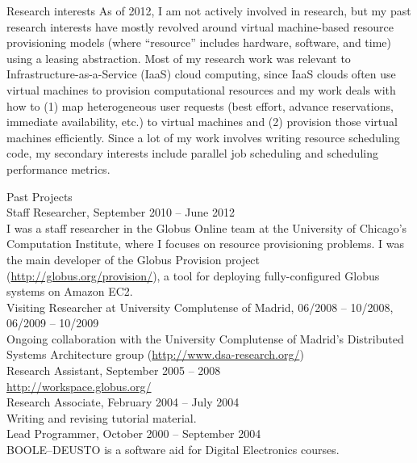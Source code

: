 \documentclass{resume}
\begin{document}
\begin{category}{Research interests}
\citembullet As of 2012, I am not actively involved in research, but my past research interests have mostly revolved around virtual machine-based resource provisioning models (where ``resource'' includes hardware, software, and time) using a leasing abstraction. Most of my research work was relevant to Infrastructure-as-a-Service (IaaS) cloud computing, since IaaS clouds often use virtual machines to provision computational resources and my work deals with how to (1) map heterogeneous user requests (best effort, advance reservations, immediate availability, etc.) to virtual machines and (2) provision those virtual machines efficiently. Since a lot of my work involves writing resource scheduling code, my secondary interests include parallel job scheduling and scheduling performance metrics.
\end{category}
\begin{category}{Past Projects}
\\
Staff Researcher, September 2010 -- June 2012\\
I was a staff researcher in the Globus Online team at the University of Chicago's Computation Institute, where I focuses on resource provisioning problems. I was the main developer of the Globus Provision project (\url{http://globus.org/provision/}), a tool for deploying fully-configured Globus systems on Amazon EC2.
\\
Visiting Researcher at University Complutense of Madrid, 06/2008 -- 10/2008, 06/2009 -- 10/2009\\
Ongoing collaboration with the University Complutense of Madrid's Distributed Systems Architecture group (\url{http://www.dsa-research.org/})
\\
Research Assistant, September 2005 -- 2008\\
\url{http://workspace.globus.org/}
\\
Research Associate, February 2004 -- July 2004\\
Writing and revising tutorial material.
\\ 
Lead Programmer, October 2000 -- September 2004\\
\textsf{BOOLE--DEUSTO} is a software aid for Digital Electronics courses.
\end{category}
\end{document}
